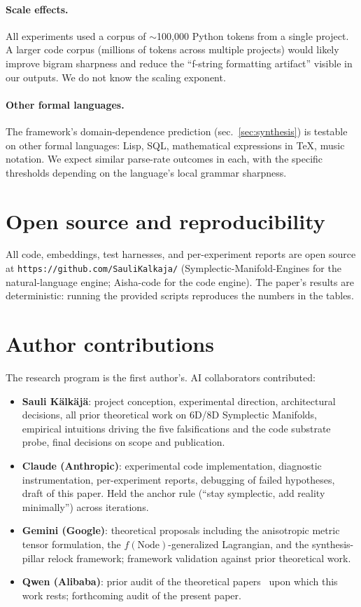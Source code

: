\documentclass[11pt,a4paper]{article}
\begin{document}
\paragraph{Scale effects.} All experiments used a corpus of $\sim$100{,}000 Python tokens from a single project. A larger code corpus (millions of tokens across multiple projects) would likely improve bigram sharpness and reduce the ``f-string formatting artifact'' visible in our outputs. We do not know the scaling exponent.

\paragraph{Other formal languages.} The framework's domain-dependence prediction (sec.~\ref{sec:synthesis}) is testable on other formal languages: Lisp, SQL, mathematical expressions in TeX, music notation. We expect similar parse-rate outcomes in each, with the specific thresholds depending on the language's local grammar sharpness.

\section{Open source and reproducibility}\label{sec:open}

All code, embeddings, test harnesses, and per-experiment reports are open source at \texttt{https://github.com/SauliKalkaja/} (Symplectic-Manifold-Engines for the natural-language engine; Aisha-code for the code engine). The paper's results are deterministic: running the provided scripts reproduces the numbers in the tables.

\section{Author contributions}\label{sec:contrib}

The research program is the first author's. AI collaborators contributed:
\begin{itemize}
\item \textbf{Sauli K\"{a}lk\"{a}j\"{a}}: project conception, experimental direction, architectural decisions, all prior theoretical work on 6D/8D Symplectic Manifolds, empirical intuitions driving the five falsifications and the code substrate probe, final decisions on scope and publication.
\item \textbf{Claude (Anthropic)}: experimental code implementation, diagnostic instrumentation, per-experiment reports, debugging of failed hypotheses, draft of this paper. Held the anchor rule (``stay symplectic, add reality minimally'') across iterations.
\item \textbf{Gemini (Google)}: theoretical proposals including the anisotropic metric tensor formulation, the $f(\text{Node})$-generalized Lagrangian, and the synthesis-pillar relock framework; framework validation against prior theoretical work.
\item \textbf{Qwen (Alibaba)}: prior audit of the theoretical papers~\cite{kalk6d, kalk8d, kalkquantum, kalknbody, kalkclimate, kalkecon} upon which this work rests; forthcoming audit of the present paper.
\end{itemize}
\end{document}
